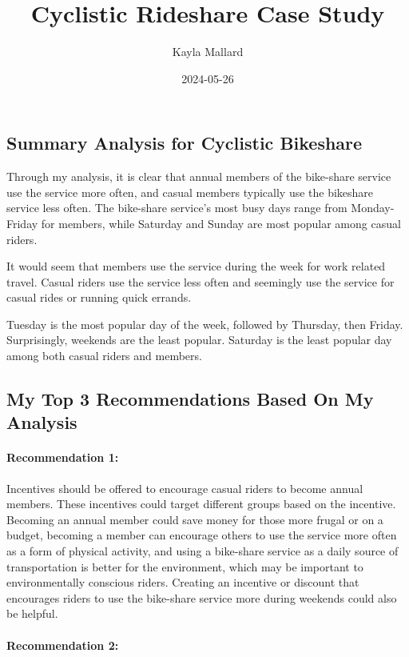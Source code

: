 \documentclass[
]{article}
\title{Cyclistic Rideshare Case Study}
\author{Kayla Mallard}
\date{2024-05-26}
\begin{document}
\maketitle

\subsection{Summary Analysis for Cyclistic
Bikeshare}\label{summary-analysis-for-cyclistic-bikeshare}

Through my analysis, it is clear that annual members of the bike-share
service use the service more often, and casual members typically use the
bikeshare service less often. The bike-share service's most busy days
range from Monday-Friday for members, while Saturday and Sunday are most
popular among casual riders.

It would seem that members use the service during the week for work
related travel. Casual riders use the service less often and seemingly
use the service for casual rides or running quick errands.

Tuesday is the most popular day of the week, followed by Thursday, then
Friday. Surprisingly, weekends are the least popular. Saturday is the
least popular day among both casual riders and members.

\subsection{My Top 3 Recommendations Based On My
Analysis}\label{my-top-3-recommendations-based-on-my-analysis}

\paragraph{Recommendation 1:}\label{recommendation-1}

Incentives should be offered to encourage casual riders to become annual
members. These incentives could target different groups based on the
incentive. Becoming an annual member could save money for those more
frugal or on a budget, becoming a member can encourage others to use the
service more often as a form of physical activity, and using a
bike-share service as a daily source of transportation is better for the
environment, which may be important to environmentally conscious riders.
Creating an incentive or discount that encourages riders to use the
bike-share service more during weekends could also be helpful.

\paragraph{Recommendation 2:}\label{recommendation-2}
\end{document}

